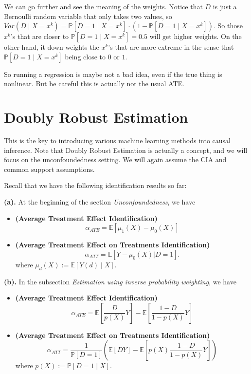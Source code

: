 \documentclass[11pt,a4paper]{amsart}
\theoremstyle{plain}
\theoremstyle{definition}
\begin{document}
	We can go further and see the meaning of the weights. Notice that $D$ is just a Bernoulli random variable that only takes two values, so $Var(D \mid X = x^{k}) = \mathbb{P}[D=1 \mid X=x^{k}]\cdot \left(1- \mathbb{P}[D=1 \mid X=x^{k}]\right)$. So those $x^{k}$'s that are closer to $\mathbb{P}[D=1 \mid X=x^{k}] = 0.5$ will get higher weights. On the other hand, it down-weights the $x^{k}$'s that are more extreme in the sense that $\mathbb{P}[D=1 \mid X=x^{k}]$ being close to $0$ or $1$. \par 
	So running a regression is maybe not a bad idea, even if the true thing is nonlinear. But be careful this is actually not the usual ATE.
	
\section{Doubly Robust Estimation}
	This is the key to introducing various machine learning methods into causal inference. Note that Doubly Robust Estimation is actually a concept, and we will focus on the unconfoundedness setting. We will again assume the CIA and common support assumptions. \par 
	Recall that we have the following identification results so far:\par 
	\textbf{(a).} At the beginning of the section \textit{Unconfoundedness}, we have
	\begin{itemize}
		\item 	\textbf{(Average Treatment Effect Identification)} 
			\[	\alpha_{A T E} = \mathbb{E}[\mu_{1}(X) - \mu_{0}(X)]	\]
		\item 		\textbf{(Average Treatment Effect on Treatments Identification)} 
		\[	\alpha_{A T T} = \mathbb{E}[Y- \mu_{0}(X)|D=1].		\]
		where $\mu_{d}(X) := \mathbb{E}[Y(d) \mid X]$.
	\end{itemize}\par 
	\textbf{(b).} In the subsection \textit{Estimation using inverse probability weighting}, we have
		\begin{itemize}
			\item 	\textbf{(Average Treatment Effect Identification)} 
				\[	\alpha_{A T E} = \mathbb{E}\left[\frac{D}{p(X)}Y\right]-\mathbb{E}\left[\frac{1-D}{1-p(X)}Y\right]	\]
			\item 		\textbf{(Average Treatment Effect on Treatments Identification)} 
			\[	\alpha_{ATT} = 
			\frac{1}{\mathbb{P}[D=1]}\left(\mathbb{E}[DY] - \mathbb{E}\left[p(X)\frac{1-D}{1-p(X)}Y\right]\right)	\]	
			where $p(X) := \mathbb{P}[D=1 \mid X]$.
		\end{itemize}
	
\end{document}
